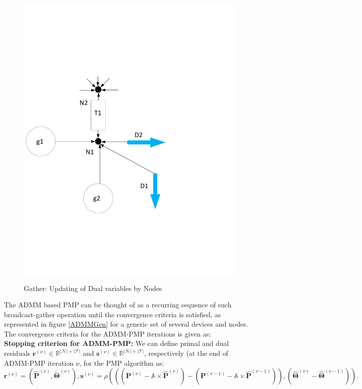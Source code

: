 \documentclass[preprint,12pt,3p]{elsarticle}
\begin{document}
\begin{figure}
\begin{center}
\vspace*{-4cm}
\includegraphics[height=15cm,width=20cm]{Prox_OPF2.pdf}
\caption{Gather: Updating of Dual variables by Nodes}
\label{Gather}
\end{center}
\end{figure}
The ADMM based PMP can be thought of as a recurring sequence of such broadcast-gather operation until the convergence criteria is satisfied, as represented in figure \ref{ADMMGen} for a generic set of several devices and nodes. The convergence criteria for the ADMM-PMP iterations is given as:\\
\textbf{Stopping criterion for ADMM-PMP: }We can define primal and dual residuals ${\mathbf{r}}^{(\nu)}\in\mathbb{R}^{|\mathcal{N}|+|\mathcal{T}|}$ and ${\mathbf{s}}^{(\nu)}\in\mathbb{R}^{|\mathcal{N}|+|\mathcal{T}|}$, respectively (at the end of ADMM-PMP iteration $\nu$, for the
PMP algorithm as:
\[
{\mathbf{r}}^{(\nu)} = \left(\hat {\mathbf{P}}^{(\nu)}, \tilde{\mathbf{\Theta}}^{(\nu)}\right),
{\mathbf{s}}^{(\nu)} = \rho\left((({\mathbf{P}}^{(\nu)} - \mathbb{A}\times\hat {\mathbf{P}}^{(\nu)}) - ({\mathbf{P}}^{(\nu-1)} - \mathbb{A}\times\hat {\mathbf{P}}^{(\nu-1)})), (\hat {\mathbf{\Theta}}^{(\nu)}- \hat {\mathbf{\Theta}}^{(\nu-1)})\right).
\]
\end{document}
